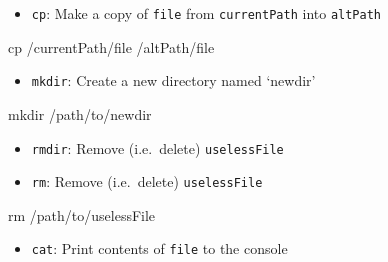 \documentclass[
]{book}
\newenvironment{Shaded}{\begin{snugshade}}{\end{snugshade}}
\newcommand{\FunctionTok}[1]{\textcolor[rgb]{0.00,0.00,0.00}{#1}}
\newcommand{\NormalTok}[1]{#1}
\providecommand{\tightlist}{%
  \setlength{\itemsep}{0pt}\setlength{\parskip}{0pt}}
\begin{document}
\begin{itemize}
\tightlist
\item
  \texttt{cp}: Make a copy of \texttt{file} from \texttt{currentPath} into \texttt{altPath}
\end{itemize}

\begin{Shaded}
\begin{Highlighting}[]
\FunctionTok{cp}\NormalTok{ /currentPath/file /altPath/file}
\end{Highlighting}
\end{Shaded}

\begin{itemize}
\tightlist
\item
  \texttt{mkdir}: Create a new directory named `newdir'
\end{itemize}

\begin{Shaded}
\begin{Highlighting}[]
\FunctionTok{mkdir}\NormalTok{ /path/to/newdir}
\end{Highlighting}
\end{Shaded}

\begin{itemize}
\tightlist
\item
  \texttt{rmdir}: Remove (i.e.~delete) \texttt{uselessFile}
\end{itemize}

\begin{Shaded}
\begin{Highlighting}[]

\end{Highlighting}
\end{Shaded}

\begin{itemize}
\tightlist
\item
  \texttt{rm}: Remove (i.e.~delete) \texttt{uselessFile}
\end{itemize}

\begin{Shaded}
\begin{Highlighting}[]
\FunctionTok{rm}\NormalTok{ /path/to/uselessFile}
\end{Highlighting}
\end{Shaded}

\begin{itemize}
\tightlist
\item
  \texttt{cat}: Print contents of \texttt{file} to the console
\end{itemize}
\end{document}
